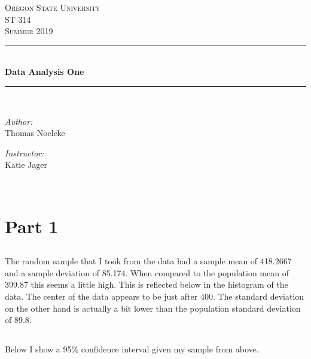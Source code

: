 \documentclass[letterpaper, onecolumn,10pt]{IEEEtran}
\begin{document}
    \begin{titlepage}
    \newcommand{\HRule}{\rule{\linewidth}{0.5mm}}
    \center
    \textsc{\Large Oregon State University}\\[1.5cm]
    \textsc{\Large ST 314}\\[0.5cm]
    \textsc{\Large Summer 2019}\\[0.5cm]
    \HRule \\[0.4cm]
    { \huge \bfseries Data Analysis One}\\[0.4cm] %
    \HRule \\[1.5cm]
    \begin{minipage}{0.4\textwidth}
        \begin{flushleft} \large
        \emph{Author:}\\
        Thomas Noelcke
        \end{flushleft}
    \end{minipage}
    \begin{minipage}{0.4\textwidth}
        \begin{flushright} \large
        \emph{Instructor:} \\
        Katie Jager\\
        \end{flushright}
    \end{minipage}\\[2cm]
		\end{titlepage}
        
        \section{Part 1}
            \subsection{}
            The random sample that I took from the data had a sample mean of 418.2667 and a sample deviation of 85.174. When compared to the population mean of 399.87 this seems a little high. This is reflected below in the histogram of the data. The center of the data appears to be just after 400. The standard deviation on the other hand is actually a bit lower than the population standard deviation of 89.8.\\
            
            
            \subsection{}
                Below I show a 95\% confidence interval given my sample from above.
                
\end{document}

